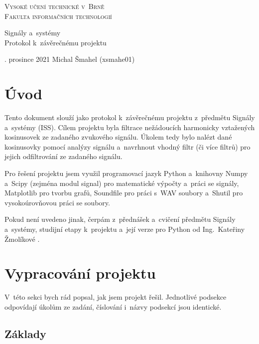 \documentclass[a4paper, 11pt, final]{article}
\begin{document}
\begin{titlepage}
\begin{center}
    \Huge \textsc{Vysoké učení technické v~Brně}\\
    \huge \textsc{Fakulta informačních technologií}
    
    
    \LARGE Signály a~systémy\\
    \Huge Protokol k~závěrečnému projektu
    
\end{center}

\Large {}. prosince 2021 \hfill Michal Šmahel (xsmahe01)
\end{titlepage}

\section{Úvod}

Tento dokument slouží jako protokol k~závěrečnému projektu z~předmětu Signály a~systémy (ISS). Cílem projektu byla filtrace nežádoucích harmonicky vztažených kosinusovek ze zadaného zvukového signálu. Úkolem tedy bylo nalézt dané kosinusovky pomocí analýzy signálu a~navrhnout vhodný filtr (či více filtrů) pro jejich odfiltrování ze zadaného signálu.

Pro řešení projektu jsem využil programovací jazyk Python a~knihovny Numpy \cite{numpy-reference} a~Scipy (zejména modul signal) \cite{scipy-reference} pro matematické výpočty a~práci se signály, Matplotlib \cite{matplotlib-reference} pro tvorbu grafů, Soundfile \cite{soundfile-reference} pro práci s~WAV soubory a~Shutil \cite{shutil-reference} pro vysokoúrovňovou práci se soubory.

Pokud není uvedeno jinak, čerpám z~přednášek a~cvičení předmětu Signály a~systémy, studijní etapy k~projektu \cite{study-phase} a~její verze pro Python od Ing.~Kateřiny Žmolíkové \cite{zmolikova-demo}.

\section{Vypracování projektu}

V~této sekci bych rád popsal, jak jsem projekt řešil. Jednotlivé podsekce odpovídají úkolům ze zadání, číslování i~názvy podsekcí jsou identické.

\subsection{Základy}
\end{document}
